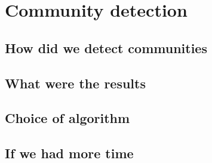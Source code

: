 \section{Community detection}

\subsection{How did we detect communities}


\subsection{What were the results}


\subsection{Choice of algorithm}


\subsection{If we had more time}

